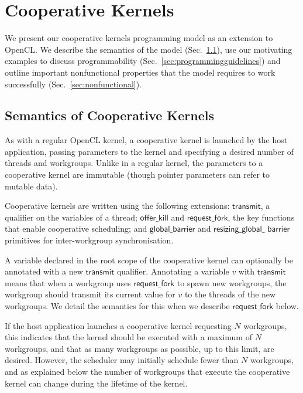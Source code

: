 \documentclass[sigconf]{acmart}
\newcommand{\mysec}{Sec.~}
\newcommand{\transmit}{\mathsf{transmit}}
\newcommand{\offerfork}{\mathsf{request\_fork}}
\newcommand{\offerkill}{\mathsf{offer\_kill}}
\newcommand{\globalbarrier}{\mathsf{global\_barrier}}
\newcommand{\resizingglobalbarrier}{\mathsf{resizing\_global\_barrier}}
\begin{document}
\section{Cooperative Kernels}\label{sec:cooperativekernels}

We present our cooperative kernels programming model as an extension
to OpenCL.  
We describe the semantics of the model
(\mysec\ref{sec:semantics}), use our motivating examples to discuss
programmability (\mysec\ref{sec:programmingguidelines}) and outline
important nonfunctional properties that the model requires to work
successfully (\mysec\ref{sec:nonfunctional}).
%

\subsection{Semantics of Cooperative Kernels}\label{sec:semantics}

As with a regular OpenCL kernel, a cooperative kernel is launched by
the host application, passing parameters to the kernel and specifying
a desired number of threads and workgroups. Unlike in a regular
kernel, the parameters to a cooperative kernel are immutable (though
pointer parameters can refer to mutable data).

Cooperative kernels are written using the following
extensions: $\transmit$, a qualifier on the variables of a
thread; $\offerkill$ and $\offerfork$, the key functions that enable
cooperative scheduling; and $\globalbarrier$ and $\mathsf{resizing\_global\_}$ $\mathsf{barrier}$
primitives for inter-workgroup synchronisation.

%
A variable declared in the root scope of the cooperative kernel can
optionally be annotated with a new $\transmit$ qualifier.  Annotating
a variable $v$ with $\transmit$ means that when a workgroup 
uses $\offerfork$ to spawn new
workgroups, the workgroup should transmit its
current value for $v$ to the threads of the new workgroups.
We detail the semantics for this when we
describe $\offerfork$ below.

%
If the host application launches a cooperative kernel requesting $N$
workgroups, this indicates that the kernel should be executed with a
maximum of $N$ workgroups, and that as many workgroups as possible, up
to this limit, are desired.  However, the scheduler may initially
schedule fewer than $N$ workgroups, and as explained below the number
of workgroups that execute the cooperative kernel can change during
the lifetime of the kernel.
\end{document}
